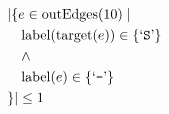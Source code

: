 \begin{align*}
&|\{e \in \mathrm{outEdges}(10)  \mid \\
&\quad \mathrm{label}(\mathrm{target}(e)) \in \{ \text{`\texttt{S}'} \}\\
&\quad \wedge\\
&\quad \mathrm{label}(e) \in \{ \text{`\texttt{-}'} \}\\
&\}| \leq 1
\end{align*}

